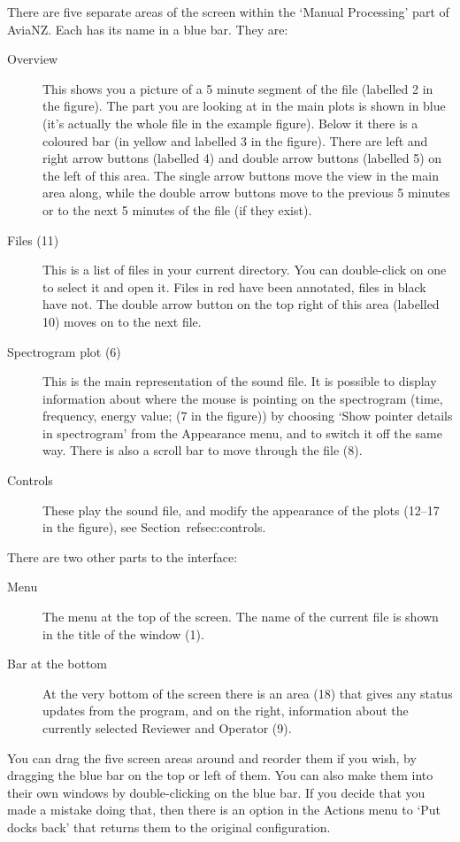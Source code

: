 \documentclass{article}
\begin{document}
There are five separate areas of the screen within the `Manual Processing' part of AviaNZ. Each has its name in a blue bar. They are:
	\begin{description}
	\item[Overview] This shows you a picture of a 5 minute segment of the file (labelled 2 in the figure). The part you are looking at in the main plots is shown in blue (it's actually the whole file in the example figure). Below it there is a coloured bar (in yellow and labelled 3 in the figure). There are left and right arrow buttons (labelled 4) and double arrow buttons (labelled 5) on the left of this area. The single arrow buttons move the view in the main area along, while the double arrow buttons move to the previous 5 minutes or to the next 5 minutes of the file (if they exist). 
	\item [Files (11)] This is a list of files in your current directory. You can double-click on one to select it and open it. Files in red have been annotated, files in black have not. The double arrow button on the top right of this area (labelled 10) moves on to the next file.
	\item[Spectrogram plot (6)] This is the main representation of the sound file. It is possible to display information about where the mouse is pointing on the spectrogram (time, frequency, energy value; (7 in the figure)) by choosing `Show pointer details in spectrogram' from the Appearance menu, and to switch it off the same way. There is also a scroll bar to move through the file (8). 
	\item[Controls] These play the sound file, and modify the appearance of the plots (12--17 in the figure), see Section~ref{sec:controls}.
	\end{description}

There are two other parts to the interface:
	\begin{description}
	\item[Menu] The menu at the top of the screen. The name of the current file is shown in the title of the window (1).
	\item[Bar at the bottom] At the very bottom of the screen there is an area (18) that gives any status updates from the program, and on the right, information about the currently selected Reviewer and Operator (9).
	\end{description}

You can drag the five screen areas around and reorder them if you wish, by dragging the blue bar on the top or left of them. You can also make them into their own windows by double-clicking on the blue bar. If you decide that you made a mistake doing that, then there is an option in the Actions menu to `Put docks back' that returns them to the original configuration.
\end{document}

